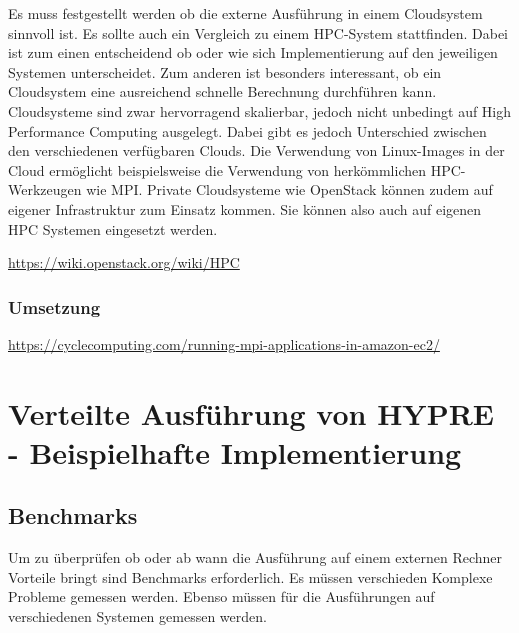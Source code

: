 \documentclass[a4paper,10pt]{article}
\numberwithin{figure}{section}
\numberwithin{table}{section}
\begin{document}
Es muss festgestellt werden ob die externe Ausführung in einem Cloudsystem sinnvoll ist.
Es sollte auch ein Vergleich zu einem HPC-System stattfinden.
Dabei ist zum einen entscheidend ob oder wie sich Implementierung auf den jeweiligen Systemen unterscheidet.
Zum anderen ist besonders interessant, ob ein Cloudsystem eine ausreichend schnelle Berechnung durchführen kann.
Cloudsysteme sind zwar hervorragend skalierbar, jedoch nicht unbedingt auf High Performance Computing ausgelegt.
Dabei gibt es jedoch Unterschied zwischen den verschiedenen verfügbaren Clouds.
Die Verwendung von Linux-Images in der Cloud ermöglicht beispielsweise die Verwendung von herkömmlichen HPC-Werkzeugen wie MPI.
Private Cloudsysteme wie OpenStack können zudem auf eigener Infrastruktur zum Einsatz kommen.
Sie können also auch auf eigenen HPC Systemen eingesetzt werden.

\url{https://wiki.openstack.org/wiki/HPC}

\subsubsection{Umsetzung}

\url{https://cyclecomputing.com/running-mpi-applications-in-amazon-ec2/}

\newpage











\section{Verteilte Ausführung von HYPRE - Beispielhafte Implementierung}




\subsection{Benchmarks}


Um zu überprüfen ob oder ab wann die Ausführung auf einem externen Rechner Vorteile bringt sind Benchmarks erforderlich.
Es müssen verschieden Komplexe Probleme gemessen werden.
Ebenso müssen für die Ausführungen auf verschiedenen Systemen gemessen werden.
\end{document}
